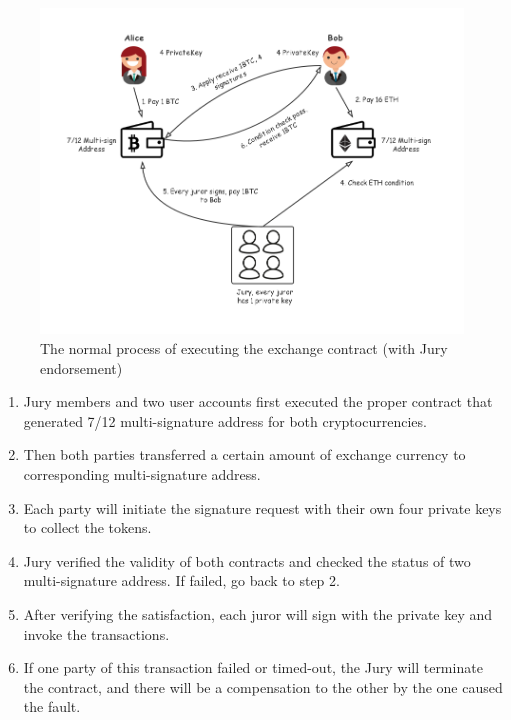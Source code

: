 \begin{figure}[H]
    \includegraphics[width=1\textwidth]{./figures/jury.png}
    \centering
    \caption{The normal process of executing the exchange contract (with Jury endorsement)}
    \label{fig:jury}
    \centering
\end{figure}
\begin{enumerate}
    \item Jury members and two user accounts first executed the proper contract that generated 7/12 multi-signature address for both cryptocurrencies.
    \item Then both parties transferred a certain amount of exchange currency to corresponding multi-signature address.
    \item Each party will initiate the signature request with their own four private keys to collect the tokens.
    \item Jury verified the validity of both contracts and checked the status of two multi-signature address. If failed, go back to step 2.
    \item After verifying the satisfaction, each juror will sign with the private key and invoke the transactions.
    \item If one party of this transaction failed or timed-out, the Jury will terminate the contract, and there will be a compensation to the other by the one caused the fault.
\end{enumerate}
